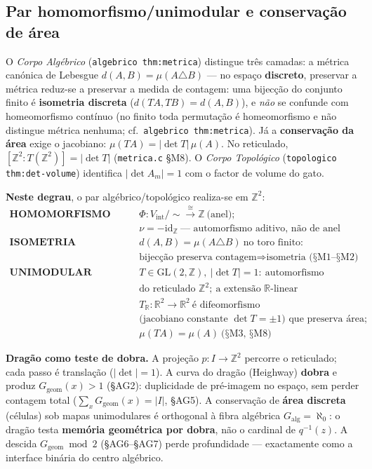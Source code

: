 \documentclass[11pt,a4paper]{article}
\newcommand{\code}[1]{\texttt{\small #1}}
\begin{document}
\subsection{Par homomorfismo/unimodular e conservação de área}\label{sec:metrica-dragao}

O \emph{Corpo Algébrico} (\code{algebrico thm:metrica}) distingue três
camadas: a métrica canónica de Lebesgue
$d(A,B)=\mu(A\triangle B)$ --- no espaço \textbf{discreto}, preservar a
métrica reduz-se a preservar a medida de contagem: uma bijecção do conjunto
finito é \textbf{isometria discreta} ($d(TA,TB)=d(A,B)$), e \emph{não} se
confunde com homeomorfismo contínuo (no finito toda permutação é homeomorfismo
e não distingue métrica nenhuma; cf.\ \code{algebrico thm:metrica}).
Já a \textbf{conservação da área} exige o jacobiano: $\mu(TA)=|\det T|\,\mu(A)$.
No reticulado, $[\mathbb{Z}^{2}:T(\mathbb{Z}^{2})]=|\det T|$ (\code{metrica.c} §M8).
O \emph{Corpo Topológico} (\code{topologico thm:det-volume}) identifica
$|\det A_m|=1$ com o factor de volume do gato.

\medskip\noindent\textbf{Neste degrau}, o par algébrico/topológico
realiza-se em $\mathbb{Z}^{2}$:
\[
\boxed{
\begin{array}{ll}
\textbf{HOMOMORFISMO} & \Phi:V_{\mathrm{int}}/{\sim}\overset{\cong}{\to}\mathbb{Z}\ \text{(anel)};\\
& \nu=-\mathrm{id}_{\mathbb{Z}}\ \text{--- automorfismo aditivo, não de anel}\\[4pt]
\textbf{ISOMETRIA DISCRETA} & d(A,B)=\mu(A\triangle B)\ \text{no toro finito:}\\
& \text{bijecção preserva contagem}\Rightarrow\text{isometria (§M1--§M2)}\\[4pt]
\textbf{UNIMODULAR} & T\in\mathrm{GL}(2,\mathbb{Z}),\ |\det T|=1:\ \text{automorfismo}\\
& \text{do reticulado }\mathbb{Z}^{2};\ \text{a extensão }\mathbb{R}\text{-linear}\\
& T_{\mathbb{R}}\colon\mathbb{R}^{2}\to\mathbb{R}^{2}\ \text{é difeomorfismo}\\
& \text{(jacobiano constante }\det T=\pm1\text{) que preserva área;}\\
& \mu(TA)=\mu(A)\ \text{(§M3, §M8)}
\end{array}}
\]

\medskip\noindent\textbf{Dragão como teste de dobra.} A projeção
$p\colon I\to\mathbb{Z}^{2}$ percorre o reticulado; cada passo é
translação ($|\det|=1$). A curva do dragão (Heighway) \textbf{dobra} e
produz $G_{\mathrm{geom}}(x)>1$ (§AG2): duplicidade de pré-imagem no
espaço, sem perder contagem total ($\sum_x G_{\mathrm{geom}}(x)=|I|$, §AG5).
A conservação de \textbf{área discreta} (células) sob mapas unimodulares
é orthogonal à fibra algébrica $G_{\mathrm{alg}}=\aleph_0$: o dragão
testa \textbf{memória geométrica por dobra}, não o cardinal de
$q^{-1}(z)$. A descida $G_{\mathrm{geom}}\bmod 2$ (§AG6--§AG7) perde
profundidade --- exactamente como a interface binária do centro algébrico.
\end{document}
